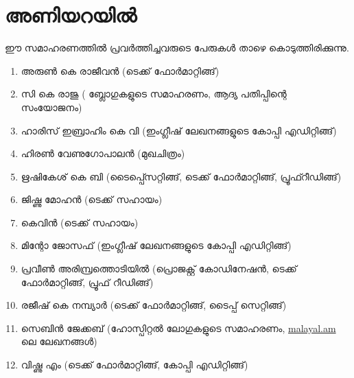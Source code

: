 \section*{അണിയറയില്‍}

ഈ സമാഹരണത്തില്‍ പ്രവര്‍ത്തിച്ചവരുടെ പേരുകള്‍ താഴെ കൊടുത്തിരിക്കുന്നു. 

\begin{enumerate}
 \item അരുണ്‍ കെ രാജീവന്‍ (ടെക്ക് ഫോര്‍മാറ്റിങ്ങ്)
 \item സി കെ രാജു ( ബ്ലോഗുകളുടെ സമാഹരണം, ആദ്യ പതിപ്പിന്റെ സംയോജനം)
 \item ഹാരിസ് ഇബ്രാഹിം  കെ വി  (ഇംഗ്ലീഷ് ലേഖനങ്ങളുടെ കോപ്പി എഡിറ്റിങ്ങ്)
 \item ഹിരണ്‍ വേണുഗോപാലന്‍ (മുഖചിത്രം)
 \item ഋഷികേശ് കെ ബി (ടൈപ്പ്സെറ്റിങ്ങ്, ടെക്ക് ഫോര്‍മാറ്റിങ്ങ്, പ്രൂഫ്റീഡിങ്ങ്)
 \item ജിഷ്ണു മോഹന്‍ (ടെക്ക് സഹായം)  
 \item കെവിന്‍ (ടെക്ക് സഹായം)
 \item മിന്റോ ജോസഫ് (ഇംഗ്ലീഷ് ലേഖനങ്ങളുടെ കോപ്പി എഡിറ്റിങ്ങ്)
 \item പ്രവീണ്‍ അരിമ്പ്രത്തൊടിയില്‍ (പ്രൊജക്റ്റ് കോഡിനേഷന്‍, ടെക്ക് ഫോര്‍മാറ്റിങ്ങ്, പ്രൂഫ് റീഡിങ്ങ്)
 \item രജീഷ് കെ നമ്പ്യാര്‍ (ടെക്ക് ഫോര്‍മാറ്റിങ്ങ്, ടൈപ്പ് സെറ്റിങ്ങ്)
 \item സെബിന്‍ ജേക്കബ് (ഹോസ്പിറ്റല്‍ ലോഗുകളുടെ സമാഹരണം, \url{malayal.am} ലെ ലേഖനങ്ങള്‍)
 \item വിഷ്ണു എം (ടെക്ക് ഫോര്‍മാറ്റിങ്ങ്, കോപ്പി എഡിറ്റിങ്ങ്)
\end{enumerate}

\newpage

